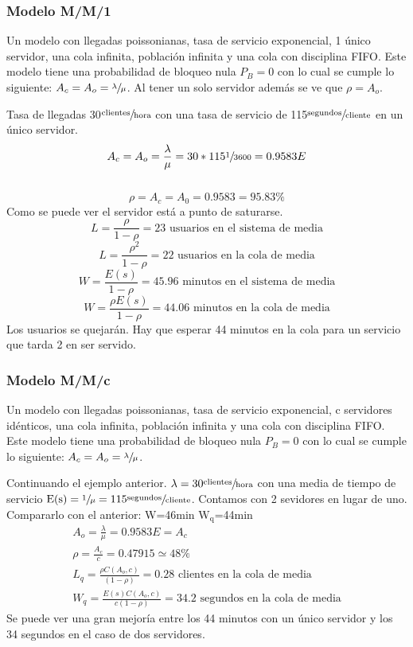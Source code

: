 \subsubsection{Modelo M/M/1}
Un modelo con llegadas poissonianas, tasa de servicio exponencial, 1 único servidor, una cola infinita, población infinita y una cola con disciplina FIFO. Este modelo tiene una probabilidad de bloqueo nula $P_B=0$ con lo cual se cumple lo siguiente: $A_c=A_o=\sfrac{\lambda}{\mu}$. Al tener un solo servidor además se ve que $\rho=A_o$.
\begin{example}[M/M/1]
Tasa de llegadas 30$\sfrac{\text{clientes}}{\text{hora}}$ con una tasa de servicio de 115$\sfrac{\text{segundos}}{\text{cliente}}$ en un único servidor.
\[A_c=A_o=\frac{\lambda}{\mu}=30*115\sfrac{1}{3600}=0.9583E\] \\
\[\rho=A_c=A_0=0.9583=95.83\%\] Como se puede ver el servidor está a punto de saturarse.\\
\[L=\frac{\rho}{1-\rho}=23\text{ usuarios en el sistema de media}\]
\[L=\frac{\rho^2}{1-\rho}=22\text{ usuarios en la cola de media}\]
\[W=\frac{E(s)}{1-\rho}=45.96\text{ minutos en el sistema de media}\]
\[W=\frac{\rho E(s)}{1-\rho}=44.06\text{ minutos en la cola de media}\]
Los usuarios se quejarán. Hay que esperar 44 minutos en la cola para un servicio que tarda 2 en ser servido.
\end{example}
\subsubsection{Modelo M/M/c}
Un modelo con llegadas poissonianas, tasa de servicio exponencial, c servidores idénticos, una cola infinita, población infinita y una cola con disciplina FIFO. Este modelo tiene una probabilidad de bloqueo nula $P_B=0$ con lo cual se cumple lo siguiente: $A_c=A_o=\sfrac{\lambda}{\mu}$.\\
\begin{example}[M/M/c]
Continuando el ejemplo anterior. $\lambda=30\sfrac{\text{clientes}}{\text{hora}}$ con una media de tiempo de servicio $\text{E(s)}=\sfrac{1}{\mu}=115\sfrac{\text{segundos}}{\text{cliente}}$. Contamos con 2 sevidores en lugar de uno. Compararlo con el anterior: W=46min $\text{W}_{\text{q}}$=44min\\
\begin{gather*}
A_o=\frac{\lambda}{\mu}=0.9583E=A_c\\
\rho=\frac{A_c}{c}=0.47915\simeq 48\% \\
L_q=\frac{\rho C(A_o,c)}{(1-\rho)}=0.28\text{ clientes en la cola de media}\\
W_q=\frac{E(s)C(A_o,c)}{c(1-\rho)}=34.2\text{ segundos en la cola de media}
\end{gather*}
Se puede ver una gran mejoría entre los 44 minutos con un único servidor y los 34 segundos en el caso de dos servidores.
\end{example}
